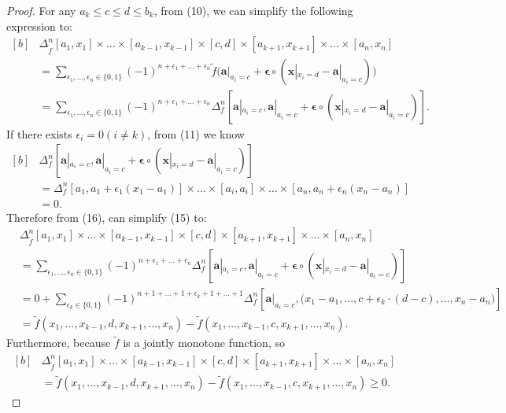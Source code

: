 \documentclass[10pt,a4paper]{amsart}
\begin{document}
\begin{proof}
    For any \(a_k\leq c\leq d\leq b_k\), from (10), we can simplify the following expression to:
    \begin{equation}
        \begin{aligned}[b]
            &\Delta_{\widetilde{f}}^n[a_1,x_1]\times\dots\times[a_{k-1},x_{k-1}]\times[c,d]\times[a_{k+1},x_{k+1}]\times\dots\times[a_n,x_n]\\
            &=\sum_{\epsilon_1,\dots,\epsilon_n\in\{0,1\}}(-1)^{n+\epsilon_1+\dots+\epsilon_n}\widetilde{f}\big(\boldsymbol{a}|_{a_i=c}+\boldsymbol{\epsilon}\circ(\boldsymbol{x}|_{x_i=d}-\boldsymbol{a}|_{a_i=c})\big)\\
            &=\sum_{\epsilon_1,\dots,\epsilon_n\in\{0,1\}}(-1)^{n+\epsilon_1+\dots+\epsilon_n}\Delta_f^n[\boldsymbol{a}|_{a_i=c},\boldsymbol{a}|_{a_i=c}+\boldsymbol{\epsilon}\circ(\boldsymbol{x}|_{x_i=d}-\boldsymbol{a}|_{a_i=c})].
        \end{aligned}
    \end{equation}
    If there exists \(\epsilon_i=0(i\neq k)\), from (11) we know
    \begin{equation}
        \begin{aligned}[b]
            &\Delta_f^n[\boldsymbol{a}|_{a_i=c},\boldsymbol{a}|_{a_i=c}+\boldsymbol{\epsilon}\circ(\boldsymbol{x}|_{x_i=d}-\boldsymbol{a}|_{a_i=c})]\\
            &=\Delta_f^n[a_1,a_1+\epsilon_1(x_1-a_1)]\times\dots\times[a_i,a_i]\times\dots\times[a_n,a_n+\epsilon_n(x_n-a_n)]\\
            &=0.
        \end{aligned}
    \end{equation}
    Therefore from (16), can simplify (15) to:
    \begin{align*}
        &\Delta_{\widetilde{f}}^n[a_1,x_1]\times\dots\times[a_{k-1},x_{k-1}]\times[c,d]\times[a_{k+1},x_{k+1}]\times\dots\times[a_n,x_n]\\
        &=\sum_{\epsilon_1,\dots,\epsilon_n\in\{0,1\}}(-1)^{n+\epsilon_1+\dots+\epsilon_n}\Delta_f^n[\boldsymbol{a}|_{a_i=c},\boldsymbol{a}|_{a_i=c}+\boldsymbol{\epsilon}\circ(\boldsymbol{x}|_{x_i=d}-\boldsymbol{a}|_{a_i=c})]\\
        &=0+\sum_{\epsilon_k\in\{0,1\}}(-1)^{n+1+\dots+1+\epsilon_k+1+\dots+1}\Delta_f^n[\boldsymbol{a}|_{a_i=c},\big(x_1-a_1,\dots,c+\epsilon_k\cdot(d-c),\dots,x_n-a_n\big)]\\
        &=\widetilde{f}(x_1,\dots,x_{k-1},d,x_{k+1},\dots,x_n)-\widetilde{f}(x_1,\dots,x_{k-1},c,x_{k+1},\dots,x_n).
    \end{align*}
    Furthermore, because \(\widetilde{f}\) is a jointly monotone function, so
    \begin{equation}
        \begin{aligned}[b]
            &\Delta_{\widetilde{f}}^n[a_1,x_1]\times\dots\times[a_{k-1},x_{k-1}]\times[c,d]\times[a_{k+1},x_{k+1}]\times\dots\times[a_n,x_n]\\
            &=\widetilde{f}(x_1,\dots,x_{k-1},d,x_{k+1},\dots,x_n)-\widetilde{f}(x_1,\dots,x_{k-1},c,x_{k+1},\dots,x_n)\geq0.
        \end{aligned}      
    \end{equation}


\end{proof}
\end{document}
